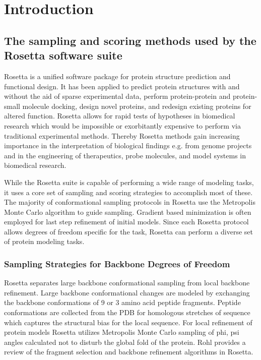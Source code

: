 \chapter{Introduction}
\section{The sampling and scoring methods used by the Rosetta software suite}
Rosetta is a unified software package for protein structure prediction and functional design.
It has been applied to predict protein structures with and without the aid of sparse experimental data, perform protein-protein and protein-small molecule docking, design novel proteins, and redesign existing proteins for altered function.
Rosetta allows for rapid tests of hypotheses in biomedical research which would be impossible or exorbitantly expensive to perform via traditional experimental methods.
Thereby Rosetta methods gain increasing importance in the interpretation of biological findings e.g. from genome projects and in the engineering of therapeutics, probe molecules, and model systems in biomedical research. 

While the Rosetta suite is capable of performing a wide range of modeling tasks, it uses a core set of sampling and scoring strategies to accomplish most of these. 
The majority of conformational sampling protocols in Rosetta use the Metropolis Monte Carlo algorithm to guide sampling.
Gradient based minimization is often employed for last step refinement of initial models.
Since each Rosetta protocol allows degrees of freedom specific for the task, Rosetta can perform a diverse set of protein modeling tasks\citep{Wang:2007du}.

\subsection{Sampling Strategies for Backbone Degrees of Freedom}
Rosetta separates large backbone conformational sampling from local backbone refinement.
Large backbone conformational changes are modeled by exchanging the backbone conformations of 9 or 3 amino acid peptide fragments.
Peptide conformations are collected from the PDB for homologous stretches of sequence\citep{Simons:1997do} which captures the structural bias for the local sequence\citep{Bystroff:1996vl}.
For local refinement of protein models Rosetta utilizes Metropolis Monte Carlo sampling of phi, psi angles calculated not to disturb the global fold of the protein.
Rohl\citep{Rohl:2004dh} provides a review of the fragment selection and backbone refinement algorithms in Rosetta. 

